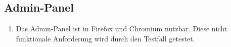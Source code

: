 \subsection*{Admin-Panel}

\begin{samepage}
    \begin{enumerate}[label=\textbf{/NFP\arabic*0/}, align=left, start=2]
        \item \label{/NFP20/} Das \Gls{Admin-Panel} ist in \Gls{Firefox} und \Gls{Chromium} nutzbar. Diese nicht funktionale Anforderung wird durch den Testfall  getestet.
    \end{enumerate}
\end{samepage}